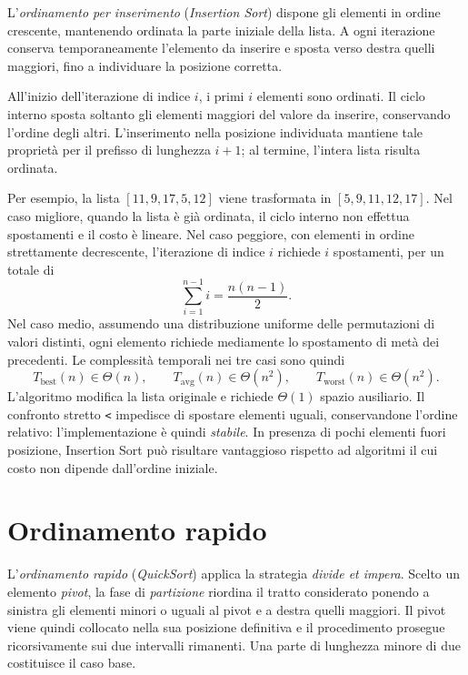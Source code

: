 L'\emph{ordinamento per inserimento} (\emph{Insertion Sort}) dispone
gli elementi in ordine crescente, mantenendo ordinata la parte
iniziale della lista. A ogni iterazione conserva temporaneamente
l'elemento da inserire e sposta verso destra quelli maggiori,
fino a individuare la posizione corretta.



All'inizio dell'iterazione di indice \(i\), i primi \(i\) elementi
sono ordinati. Il ciclo interno sposta soltanto gli elementi maggiori
del valore da inserire, conservando l'ordine degli altri.
L'inserimento nella posizione individuata mantiene tale proprietà
per il prefisso di lunghezza \(i+1\); al termine, l'intera lista
risulta ordinata.

Per esempio, la lista \([11,9,17,5,12]\) viene trasformata in
\([5,9,11,12,17]\). Nel caso migliore, quando la lista è già ordinata,
il ciclo interno non effettua spostamenti e il costo è lineare.
Nel caso peggiore, con elementi in ordine strettamente decrescente,
l'iterazione di indice \(i\) richiede \(i\) spostamenti, per un totale di
\[
  \sum_{i=1}^{n-1}i=\frac{n(n-1)}2.
\]
Nel caso medio, assumendo una distribuzione uniforme delle
permutazioni di valori distinti, ogni elemento richiede mediamente
lo spostamento di metà dei precedenti. Le complessità temporali
nei tre casi sono quindi
\[
  T_{\mathrm{best}}(n)\in\Theta(n),\qquad
  T_{\mathrm{avg}}(n)\in\Theta(n^2),\qquad
  T_{\mathrm{worst}}(n)\in\Theta(n^2).
\]
L'algoritmo modifica la lista originale e richiede \(\Theta(1)\)
spazio ausiliario. Il confronto stretto \lstinline|<| impedisce
di spostare elementi uguali, conservandone l'ordine relativo:
l'implementazione è quindi \emph{stabile}. In presenza di pochi
elementi fuori posizione, Insertion Sort può risultare vantaggioso
rispetto ad algoritmi il cui costo non dipende dall'ordine iniziale.

\clearpage

\section{Ordinamento rapido}
\label{sec:fi-ordinamento-rapido}

L'\emph{ordinamento rapido} (\emph{QuickSort}) applica la strategia
\emph{divide et impera}. Scelto un elemento \emph{pivot}, la fase di
\emph{partizione} riordina il tratto considerato ponendo a sinistra
gli elementi minori o uguali al pivot e a destra quelli maggiori.
Il pivot viene quindi collocato nella sua posizione definitiva e
il procedimento prosegue ricorsivamente sui due intervalli rimanenti.
Una parte di lunghezza minore di due costituisce il caso base.

